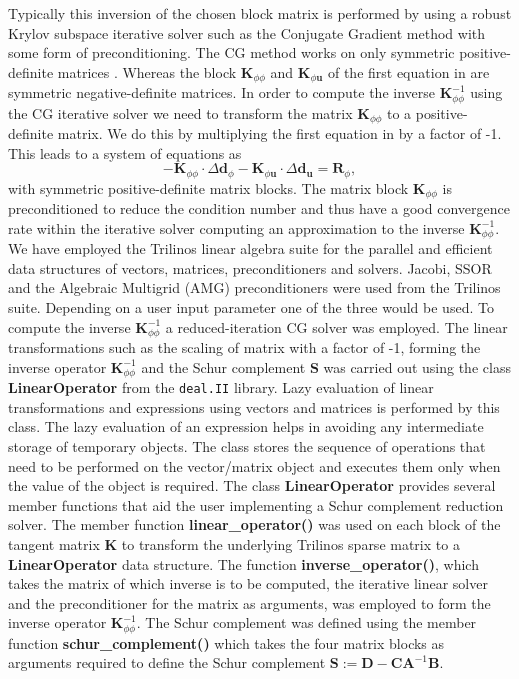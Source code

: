\documentclass[11pt,a4paper,final]{article}
\begin{document}
Typically this inversion of the chosen block matrix is performed by using a robust Krylov subspace iterative solver such as the Conjugate Gradient method with some form of preconditioning. The CG method works on only symmetric positive-definite matrices \cite{EdwinK.P.Chong2013}. Whereas the block $\mathbf{K}_{\phi \phi}$ and $\mathbf{K}_{\phi \mathbf{u}}$ of the first equation in  are symmetric negative-definite matrices. In order to compute the inverse $\mathbf{K}_{\phi \phi}^{-1}$ using the CG iterative solver we need to transform the matrix $\mathbf{K}_{\phi \phi}$ to a positive-definite matrix. We do this by multiplying the first equation in  by a factor of -1. This leads to a system of equations as
\begin{equation}
-\mathbf{K}_{\phi \phi} \cdot \Delta \mathbf{d}_{\phi} - \mathbf{K}_{\phi \mathbf{u}} \cdot \Delta \mathbf{d}_{\mathbf{u}} = \mathbf{R}_{\phi},
\end{equation}
with symmetric positive-definite matrix blocks. The matrix block $\mathbf{K}_{\phi \phi}$ is preconditioned to reduce the condition number and thus have a good convergence rate within the iterative solver computing an approximation to the inverse $\mathbf{K}_{\phi \phi}^{-1}$. We have employed the Trilinos \cite{heroux2005overview} linear algebra suite for the parallel and efficient data structures of vectors, matrices, preconditioners and solvers. Jacobi, SSOR and the Algebraic Multigrid (AMG) \cite{gee2006ml} preconditioners were used from the Trilinos suite. Depending on a user input parameter one of the three would be used. To compute the inverse $\mathbf{K}_{\phi \phi}^{-1}$ a reduced-iteration CG solver was employed. The linear transformations such as the scaling of matrix with a factor of -1, forming the inverse operator $\mathbf{K}_{\phi \phi}^{-1}$ and the Schur complement $\mathbf{S}$ was carried out using the class \textbf{LinearOperator} from the \texttt{deal.II} library. Lazy evaluation of linear transformations and expressions using vectors and matrices is performed by this class. The lazy evaluation of an expression helps in avoiding any intermediate storage of temporary objects. The class stores the sequence of operations that need to be performed on the vector/matrix object and executes them only when the value of the object is required. The class \textbf{LinearOperator} provides several member functions that aid the user implementing a Schur complement reduction solver. The member function \textbf{linear\_operator()} was used on each block of the tangent matrix $\mathbf{K}$ to transform the underlying Trilinos sparse matrix to a \textbf{LinearOperator} data structure. The function \textbf{inverse\_operator()}, which takes the matrix of which inverse is to be computed, the iterative linear solver and the preconditioner for the matrix as arguments, was employed to form the inverse operator $\mathbf{K}_{\phi \phi}^{-1}$. The Schur complement was defined using the member function \textbf{schur\_complement()} which takes the four matrix blocks as arguments required to define the Schur complement $\mathbf{S} := \mathbf{D} - \mathbf{C} \mathbf{A}^{-1} \mathbf{B}$. \par 
\end{document}
